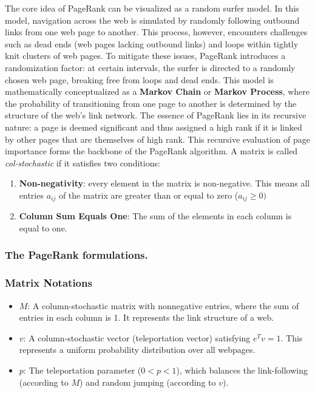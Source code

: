 \documentclass[unicode,11pt,a4paper,oneside,numbers=endperiod,openany]{scrartcl}
\begin{document}
The core idea of PageRank can be visualized as a random surfer model. In this model, navigation across the web is simulated by randomly following outbound links from one web page to another. This process, however, encounters challenges such as dead ends (web pages lacking outbound links) and loops within tightly knit clusters of web pages. To mitigate these issues, PageRank introduces a randomization factor: at certain intervals, the surfer is directed to a randomly chosen web page, breaking free from loops and dead ends.
\newline
This model is mathematically conceptualized as a \textbf{Markov Chain} or \textbf{Markov Process}, where the probability of transitioning from one page to another is determined by the structure of the web's link network. The essence of PageRank lies in its recursive nature: a page is deemed significant and thus assigned a high rank if it is linked by other pages that are themselves of high rank. This recursive evaluation of page importance forms the backbone of the PageRank algorithm.
\newline \newline
A matrix is called \textit{col-stochastic} if it satisfies two conditions:
\begin{enumerate}
 \item {\textbf{Non-negativity}: every element in the matrix is non-negative. This means all entries $a_{ij}$ of the matrix are greater than or equal to zero ($a_{ij} \geq 0)$}
 \item{\textbf{Column Sum Equals One}: The sum of the elements in each column is equal to one.}
\end{enumerate}
\subsubsection{The PageRank formulations.}
\subsubsection*{Matrix Notations}
\begin{itemize}
    \item $M$: A column-stochastic matrix with nonnegative entries, where the sum of entries in each column is 1. It represents the link structure of a web.
    \item $v$: A column-stochastic vector (teleportation vector) satisfying $e^T v = 1$. This represents a uniform probability distribution over all webpages.
    \item $p$: The teleportation parameter ($0 < p < 1$), which balances the link-following (according to $M$) and random jumping (according to $v$).
\end{itemize}
\end{document}
